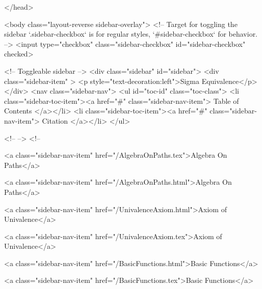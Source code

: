   
</head>




  <body class="layout-reverse sidebar-overlay">
    <!-- Target for toggling the sidebar `.sidebar-checkbox` is for regular
     styles, `#sidebar-checkbox` for behavior. -->
<input type="checkbox" class="sidebar-checkbox" id="sidebar-checkbox" checked>

<!-- Toggleable sidebar -->
<div class="sidebar" id="sidebar">
  <div class="sidebar-item" >
    <p style="text-decoration:left">Sigma Equivalence</p>
  </div>
  <nav class="sidebar-nav">
    <ul id="toc-id" class="toc-class">
  <li class="sidebar-toc-item"><a href="#" class="sidebar-nav-item"> Table of Contents </a></li>
  <li class="sidebar-toc-item"><a href="#" class="sidebar-nav-item"> Citation </a></li>
</ul>


    <!--  -->
    <!-- 
      
    
      
    
      
    
      
        
      
    
      
        
          <a class="sidebar-nav-item" href="/AlgebraOnPaths.tex">Algebra On Paths</a>
        
      
    
      
        
          <a class="sidebar-nav-item" href="/AlgebraOnPaths.html">Algebra On Paths</a>
        
      
    
      
        
          <a class="sidebar-nav-item" href="/UnivalenceAxiom.html">Axiom of Univalence</a>
        
      
    
      
        
          <a class="sidebar-nav-item" href="/UnivalenceAxiom.tex">Axiom of Univalence</a>
        
      
    
      
        
          <a class="sidebar-nav-item" href="/BasicFunctions.html">Basic Functions</a>
        
      
    
      
        
          <a class="sidebar-nav-item" href="/BasicFunctions.tex">Basic Functions</a>
        
      
    

